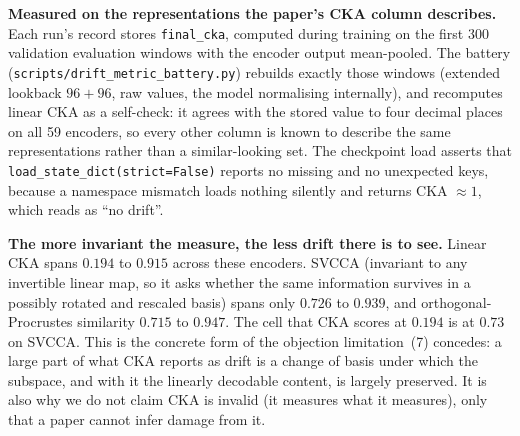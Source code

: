 \textbf{Measured on the representations the paper's CKA column describes.} Each
run's record stores \texttt{final\_cka}, computed during training on the first
300 validation evaluation windows with the encoder output mean-pooled. The
battery (\texttt{scripts/drift\_metric\_battery.py}) rebuilds exactly those
windows (extended lookback $96{+}96$, raw values, the model normalising
internally), and recomputes linear CKA as a self-check: it agrees with the
stored value to four decimal places on all 59 encoders, so every other column is
known to describe the same representations rather than a similar-looking set.
The checkpoint load asserts that \texttt{load\_state\_dict(strict=False)}
reports no missing and no unexpected keys, because a namespace mismatch loads
nothing silently and returns CKA ${\approx}1$, which reads as ``no drift''.

\begin{table}[ht]
\centering
\caption{\textbf{Six measures of representation change on 59 Moirai-Small
encoders.} All computed on identical windows and identical pooling. ``$\rho$ with
CKA'' is the rank correlation of each measure with linear CKA over the 59
encoders; the last two columns correlate each measure with forgetting, pooled and
then within each of the six groups of at least five encoders. Forgetting here is
the \emph{selection-split} figure: these runs stored no zero-shot test MSE, so a
held-out contrast cannot be reconstructed from them, and
\S\ref{sec:analysis:heldout} shows same-split scoring can invert the sign of the
intervention. This arm is therefore a comparison of measures, not a held-out
claim. Emitted by \texttt{scripts/drift\_metric\_battery.py}; the pooled column
mixes three datasets and is descriptive for the reason
Appendix~\ref{app:crosscell} gives about pooling.}
\label{tab:driftmetrics}

\end{table}

\textbf{The more invariant the measure, the less drift there is to see.} Linear
CKA spans $0.194$ to $0.915$ across these encoders. SVCCA (invariant to any
invertible linear map, so it asks whether the same information survives in a
possibly rotated and rescaled basis) spans only $0.726$ to $0.939$, and
orthogonal-Procrustes similarity $0.715$ to $0.947$. The cell that CKA scores at
$0.194$ is at $0.73$ on SVCCA. This is the concrete form of the objection
limitation~(7) concedes: a large part of what CKA reports as drift is a change of
basis under which the subspace, and with it the linearly decodable content, is
largely preserved. It is also why we do not claim CKA is invalid (it measures
what it measures), only that a paper cannot infer damage from it.

